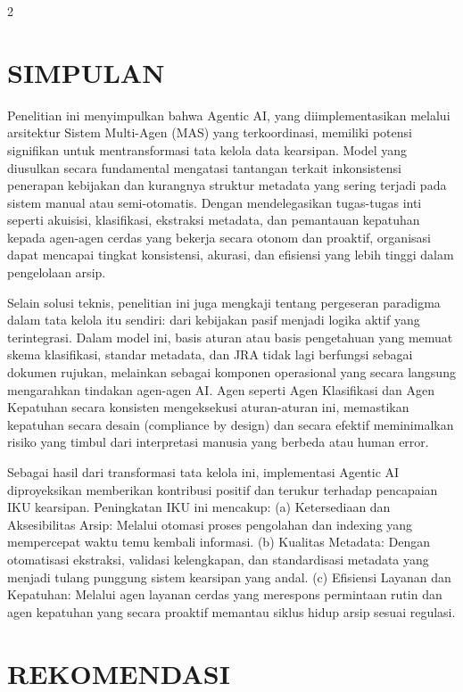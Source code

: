 \documentclass[12pt,a4paper]{article}
\begin{document}
\begin{multicols}{2}
\section{SIMPULAN}

Penelitian ini menyimpulkan bahwa Agentic AI, yang diimplementasikan melalui arsitektur Sistem Multi-Agen (MAS) yang terkoordinasi, memiliki potensi signifikan untuk mentransformasi tata kelola data kearsipan. Model yang diusulkan secara fundamental mengatasi tantangan terkait inkonsistensi penerapan kebijakan dan kurangnya struktur metadata yang sering terjadi pada sistem manual atau semi-otomatis. Dengan mendelegasikan tugas-tugas inti seperti akuisisi, klasifikasi, ekstraksi metadata, dan pemantauan kepatuhan kepada agen-agen cerdas yang bekerja secara otonom dan proaktif, organisasi dapat mencapai tingkat konsistensi, akurasi, dan efisiensi yang lebih tinggi dalam pengelolaan arsip.

Selain solusi teknis, penelitian ini juga mengkaji tentang pergeseran paradigma dalam tata kelola itu sendiri: dari kebijakan pasif menjadi logika aktif yang terintegrasi. Dalam model ini, basis aturan atau basis pengetahuan yang memuat skema klasifikasi, standar metadata, dan JRA tidak lagi berfungsi sebagai dokumen rujukan, melainkan sebagai komponen operasional yang secara langsung mengarahkan tindakan agen-agen AI. Agen seperti Agen Klasifikasi dan Agen Kepatuhan secara konsisten mengeksekusi aturan-aturan ini, memastikan kepatuhan secara desain (compliance by design) dan secara efektif meminimalkan risiko yang timbul dari interpretasi manusia yang berbeda atau human error.

Sebagai hasil dari transformasi tata kelola ini, implementasi Agentic AI diproyeksikan memberikan kontribusi positif dan terukur terhadap pencapaian IKU kearsipan. Peningkatan IKU ini mencakup: (a) Ketersediaan dan Aksesibilitas Arsip: Melalui otomasi proses pengolahan dan indexing yang mempercepat waktu temu kembali informasi. (b) Kualitas Metadata: Dengan otomatisasi ekstraksi, validasi kelengkapan, dan standardisasi metadata yang menjadi tulang punggung sistem kearsipan yang andal. (c) Efisiensi Layanan dan Kepatuhan: Melalui agen layanan cerdas yang merespons permintaan rutin dan agen kepatuhan yang secara proaktif memantau siklus hidup arsip sesuai regulasi.

\section{REKOMENDASI}


\end{multicols}
\end{document}
